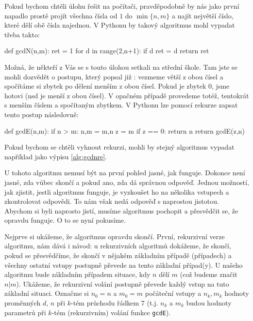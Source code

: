 Pokud bychom chtěli úlohu řešit na počítači, pravděpodobně by nás jako první napadlo prostě
projít všechna čísla od $1$ do $\min \{n,m\}$ a najít největší číslo, které dělí obě čísla najednou.
V Pythonu by takový algoritmus mohl vypadat třeba takto:

\begin{python}
def gcdN(n,m):
    ret = 1
    for d in range(2,n+1):
        if d %
            ret = d
    return ret
\end{python}

Možná, že někteří z Vás se s touto úlohou setkali na střední škole. Tam jste se mohli dozvědět o postupu, který
popsal již : vezmeme větší z obou čísel a spočítáme si zbytek po dělení menším z obou čísel. Pokud je
zbytek 0, jsme hotovi (nsd je menší z obou čísel). V opačném případě provedeme totéž, tentokrát s menším číslem
a spočítaným zbytkem. V Pythonu lze pomocí rekurze zapsat tento postup následovně:

\begin{python}
def gcdE(n,m):
    if n > m:
        n,m = m,n
    z = m %
    if z == 0:
        return n
    return gcdE(z,n)
\end{python}

Pokud bychom se chtěli vyhnout rekurzi, mohli by stejný algoritmus vypadat
například jako výpisu \ref{alg:gcdnre}.


U tohoto algoritmu nemusí být na první pohled jasné, jak funguje. Dokonce není jasné, zda vůbec skončí a pokud ano, zda
dá správnou odpověď.  Jednou možností, jak zjistit, jestli algoritmus funguje, je vyzkoušet ho na několika vstupech a
zkontrolovat odpovědi. To nám však nedá odpověď s naprostou jistotou.  Abychom si byli naprosto jistí, musíme
algoritmus pochopit a přesvědčit se, že opravdu funguje. O to se nyní pokusíme.

Nejprve si ukážeme, že
algoritmus opravdu skončí.  První, rekurzivní verze algoritmu, nám dává i návod: u rekurzivních algoritmů dokážeme,
že skončí, pokud se přesvědčíme, že skončí v nějakém základním případě (případech) a všechny ostatní vstupy postupně převede
na tento základní případ(y).  U našeho algoritmu bude základním případem situace, kdy $n$ dělí $m$ (což budeme značit $n|m$).  Ukážeme, že rekurzivní volání
postupně převede každý vstup na tuto základní situaci. Označme si $n_0 = n$ a $m_0=m$ počáteční vstupy a $n_k, m_k$ hodnoty proměnných
$d$, $n$ při $k$-tém průchodu řádkem 7 (t.j. $n_k$ a $m_k$ budou hodnoty parametrů při $k$-tém (rekurzivním) volání funkce {\tt gcdE}).

